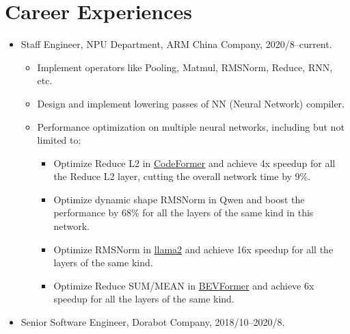 \documentclass[letterpaper]{article}
\begin{document}
\section*{Career Experiences}
\begin{itemize}
    \item Staff Engineer, NPU Department, ARM China Company, 2020/8--current.
        \begin{itemize}
            \item Implement operators like Pooling, Matmul, RMSNorm, Reduce, RNN, etc.
            \item Design and implement lowering passes of NN (Neural Network) compiler.
            \item Performance optimization on multiple neural networks, including but not limited to:
                \begin{itemize}
                    \item Optimize Reduce L2 in \href{https://github.com/sczhou/CodeFormer}{CodeFormer} and achieve 4x speedup for all the Reduce L2 layer, cutting the overall network time by 9\%.
                    \item Optimize dynamic shape RMSNorm in Qwen and boost the performance by 68\% for all the layers of the same kind in this network.
                    \item Optimize RMSNorm in \href{https://github.com/meta-llama/llama}{llama2} and achieve 16x speedup for all the layers of the same kind.
                    \item Optimize Reduce SUM/MEAN in \href{https://github.com/fundamentalvision/BEVFormer}{BEVFormer} and achieve 6x speedup for all the layers of the same kind.
                \end{itemize}
        \end{itemize}
    \item Senior Software Engineer, Dorabot Company, 2018/10--2020/8.

\end{itemize}
\end{document}
